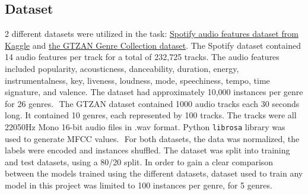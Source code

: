 \documentclass[11.5pt]{article}
\begin{document}
\subsection{Dataset}
2 different datasets were utilized in the task: \href{https://www.kaggle.com/zaheenhamidani/ultimate-spotify-tracks-db}{Spotify audio features dataset from Kaggle} and \href{http://marsyas.info/downloads/datasets.html}{the GTZAN Genre Collection dataset}. The Spotify dataset contained 14 audio features per track for a total of 232,725 tracks. The audio features included popularity, acousticness, danceability, duration, energy, instrumentalness, key, liveness, loudness, mode, speechiness, tempo, time signature, and valence. The dataset had approximately 10,000 instances per genre for 26 genres.  
​
The GTZAN dataset contained 1000 audio tracks each 30 seconds long. It contained 10 genres, each represented by 100 tracks. The tracks were all 22050Hz Mono 16-bit audio files in .wav format. Python \texttt{librosa} library was used to generate MFCC values.
​
For both datasets, the data was normalized, the labels were encoded and instances shuffled. The dataset was split into training and test datasets, using a 80/20 split. In order to gain a clear comparison between the models trained using the different datasets, dataset used to train any model in this project was limited to 100 instances per genre, for 5 genres. 
​
​
\end{document}

